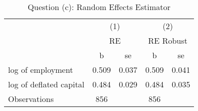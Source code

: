 \begin{table}[htbp]\centering
\def\sym#1{\ifmmode^{#1}\else\(^{#1}\)\fi}
\caption{Question (c): Random Effects Estimator}
\begin{tabular}{l*{2}{cc}}
\toprule
                    &\multicolumn{2}{c}{(1)}  &\multicolumn{2}{c}{(2)}  \\
                    &\multicolumn{2}{c}{RE}   &\multicolumn{2}{c}{RE Robust}\\
                    &           b&          se&           b&          se\\
\midrule
log of employment   &       0.509&       0.037&       0.509&       0.041\\
log of deflated capital&       0.484&       0.029&       0.484&       0.035\\
\midrule
Observations        &         856&            &         856&            \\
\bottomrule
\end{tabular}
\end{table}

